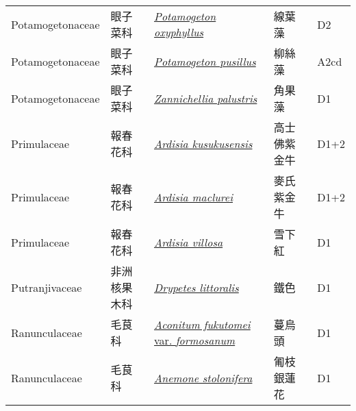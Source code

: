 {\begin{longtable}{L{2.5cm}L{2cm}L{5cm}L{2.5cm}L{3cm}}
    Potamogetonaceae & 眼子菜科 & \href{http://www.theplantlist.org/tpl1.1/search?q=Potamogeton+oxyphyllus}{\textit{Potamogeton oxyphyllus} } & 線葉藻 & D2    \\
    Potamogetonaceae & 眼子菜科 & \href{http://www.theplantlist.org/tpl1.1/search?q=Potamogeton+pusillus}{\textit{Potamogeton pusillus} } & 柳絲藻 & A2cd    \\
    Potamogetonaceae & 眼子菜科 & \href{http://www.theplantlist.org/tpl1.1/search?q=Zannichellia+palustris}{\textit{Zannichellia palustris} } & 角果藻 & D1    \\
    Primulaceae & 報春花科 & \href{http://www.theplantlist.org/tpl1.1/search?q=Ardisia+kusukusensis}{\textit{Ardisia kusukusensis} } & 高士佛紫金牛 & D1+2    \\
    Primulaceae & 報春花科 & \href{http://www.theplantlist.org/tpl1.1/search?q=Ardisia+maclurei}{\textit{Ardisia maclurei} } & 麥氏紫金牛 & D1+2    \\
    Primulaceae & 報春花科 & \href{http://www.theplantlist.org/tpl1.1/search?q=Ardisia+villosa}{\textit{Ardisia villosa} } & 雪下紅 & D1    \\
    Putranjivaceae & 非洲核果木科 & \href{http://www.theplantlist.org/tpl1.1/search?q=Drypetes+littoralis}{\textit{Drypetes littoralis} } & 鐵色 & D1    \\
    Ranunculaceae & 毛茛科 & \href{http://www.theplantlist.org/tpl1.1/search?q=Aconitum+fukutomei+var.+formosanum}{\textit{Aconitum fukutomei} var. \textit{formosanum} } & 蔓烏頭 & D1    \\
    Ranunculaceae & 毛茛科 & \href{http://www.theplantlist.org/tpl1.1/search?q=Anemone+stolonifera}{\textit{Anemone stolonifera} } & 匍枝銀蓮花 & D1    \\

\end{longtable}}
